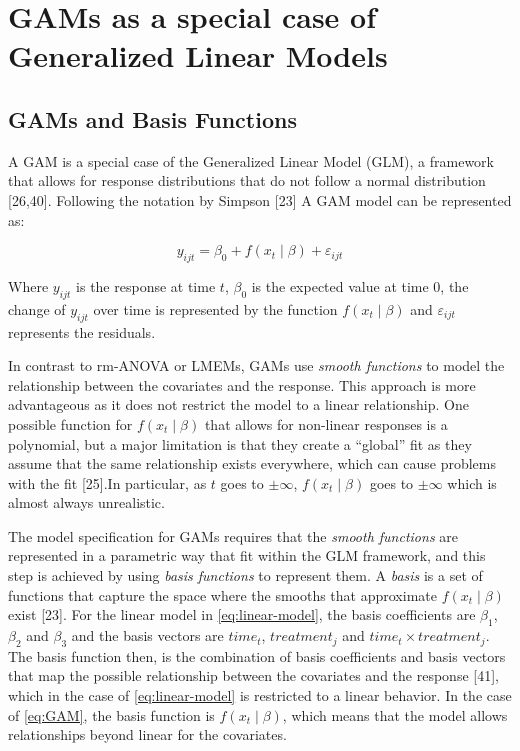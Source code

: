 \documentclass[
]{article}
\begin{document}
\hypertarget{gams-as-a-special-case-of-generalized-linear-models}{%
\section{GAMs as a special case of Generalized Linear Models}\label{gams-as-a-special-case-of-generalized-linear-models}}

\hypertarget{gams-and-basis-functions}{%
\subsection{GAMs and Basis Functions}\label{gams-and-basis-functions}}

A GAM is a special case of the Generalized Linear Model (GLM), a framework that allows for response distributions that do not follow a normal distribution {[}26,40{]}. Following the notation by Simpson {[}23{]} A GAM model can be represented as:

\begin{equation}
  y_{ijt}=\beta_0+f(x_t\mid \beta)+\varepsilon_{ijt}
  \label{eq:GAM}
\end{equation}

Where \(y_{ijt}\) is the response at time \(t\), \(\beta_0\) is the expected value at time 0, the change of \(y_{ijt}\) over time is represented by the function \(f(x_t\mid \beta)\) and \(\varepsilon_{ijt}\) represents the residuals.

In contrast to rm-ANOVA or LMEMs, GAMs use \emph{smooth functions} to model the relationship between the covariates and the response. This approach is more advantageous as it does not restrict the model to a linear relationship. One possible function for \(f(x_t\mid \beta)\) that allows for non-linear responses is a polynomial, but a major limitation is that they create a ``global'' fit as they assume that the same relationship exists everywhere, which can cause problems with the fit {[}25{]}.In particular, as \(t\) goes to \(\pm \infty\), \(f(x_t \mid \beta)\) goes to \(\pm \infty\) which is almost always unrealistic.

The model specification for GAMs requires that the \emph{smooth functions} are represented in a parametric way that fit within the GLM framework, and this step is achieved by using \emph{basis functions} to represent them. A \emph{basis} is a set of functions that capture the space where the smooths that approximate \(f(x_t \mid \beta)\) exist {[}23{]}. For the linear model in \eqref{eq:linear-model}, the basis coefficients are \(\beta_1\), \(\beta_2\) and \(\beta_3\) and the basis vectors are \(time_t\), \(treatment_j\) and \(time_t \times treatment_j\). The basis function then, is the combination of basis coefficients and basis vectors that map the possible relationship between the covariates and the response {[}41{]}, which in the case of \eqref{eq:linear-model} is restricted to a linear behavior. In the case of \eqref{eq:GAM}, the basis function is \(f(x_t\mid \beta)\), which means that the model allows relationships beyond linear for the covariates.
\end{document}
